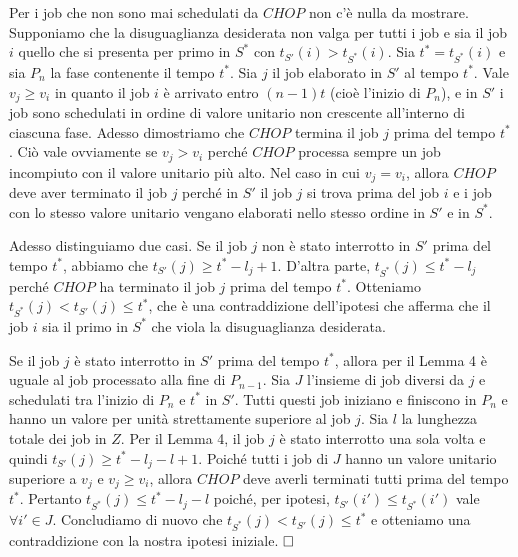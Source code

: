 \documentclass[twoside,openany,titlepage,fleqn,
	headinclude,12pt,a4paper,BCOR5mm,footinclude]{scrbook}
\begin{document}
Per i job che non sono mai schedulati da $CHOP$ non c'è nulla da mostrare. Supponiamo che la disuguaglianza desiderata non valga per tutti i job e sia il job $i$ quello che si presenta per primo in $S^{*}$ con $t_{S'}(i) > t_{S^{*}}(i)$. Sia $t^{*} = t_{S^{*}}(i)$ e sia $P_{n}$ la fase contenente il tempo $t^{*}$. Sia $j$ il job elaborato in $S'$ al tempo $t^{*}$. Vale $v_{j} \geq v_{i}$ in quanto il job $i$ è arrivato entro $(n - 1)t$ (cioè l'inizio di $P_{n}$), e in $S'$ i job sono schedulati in ordine di valore unitario non crescente all'interno di ciascuna fase. Adesso dimostriamo che $CHOP$ termina il job $j$ prima del tempo $t^{*}$. Ciò vale ovviamente se $v_{j} > v_{i}$ perché $CHOP$ processa sempre un job incompiuto con il valore unitario più alto. Nel caso in cui $v_{j} = v_{i}$, allora $CHOP$ deve aver terminato il job $j$ perché in $S'$ il job $j$ si trova prima del job $i$ e i job con lo stesso valore unitario vengano elaborati nello stesso ordine in $S'$ e in $S^{*}$. 

Adesso distinguiamo due casi. Se il job $j$ non è stato interrotto in $S'$ prima del tempo $t^{*}$, abbiamo che $t_{S'}(j) \geq t^{*} - l_{j} + 1$. D'altra parte, $t_{S^{*}}(j) \leq t^{*} - l_{j}$ perché $CHOP$ ha terminato il job $j$ prima del tempo $t^{*}$. Otteniamo $t_{S^{*}}(j) < t_{S'}(j) \leq t^{*}$, che è una contraddizione dell'ipotesi che afferma che il job $i$ sia il primo in $S^{*}$ che viola la disuguaglianza desiderata. 

Se il job $j$ è stato interrotto in $S'$ prima del tempo $t^{*}$, allora per il Lemma 4 è uguale al job processato alla fine di $P_{n - 1}$. Sia $J$ l'insieme di job diversi da $j$ e schedulati tra l'inizio di $P_{n}$ e $t^{*}$ in $S'$. Tutti questi job iniziano e finiscono in $P_{n}$ e hanno un valore per unità strettamente superiore al job $j$. Sia $l$ la lunghezza totale dei job in $Z$. Per il Lemma 4, il job $j$ è stato interrotto una sola volta e quindi $t_{S'}(j) \geq t^{*} - l_{j} - l + 1$. Poiché tutti i job di $J$ hanno un valore unitario superiore a $v_{j}$ e $v_{j} \geq v_{i}$, allora $CHOP$ deve averli terminati tutti prima del tempo $t^{*}$. Pertanto $t_{S^{*}}(j) \leq t^{*} - l_{j} - l$ poiché, per ipotesi, $t_{S'}(i') \leq t_{S^{*}}(i')$ vale $\forall i' \in J$. Concludiamo di nuovo che $t_{S^{*}}(j) < t_{S'}(j) \leq t^{*}$ e otteniamo una contraddizione con la nostra ipotesi iniziale. $\hfill \square$
\newline
\end{document}
